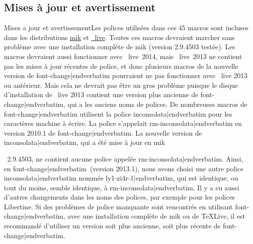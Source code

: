 {\subsection{Mises \`a jour et avertissement}{Mises a jour et avertissement}Les polices utilis\'ees dans ces 45 macros sont incluses dans  les distributions \href{http://miktex.org/}{{\caps m{\eightrm i}k}\capstex} et \href{http://www.tug.org/texlive/}{\capstex~{\caps l{\eightrm ive}}}. Toutes ces macros devraient marcher sans probl\`eme avec une installation compl\`ete de {{\caps m{\eightrm i}k}\capstex} (version 2.9.4503 test\'ee). Les macros devraient aussi fonctionner avec \capstex~{\caps l{\eightrm ive}}~2014, mais \capstex~{\caps l{\eightrm ive}}~2013 ne contient pas les mises \`a jour r\'ecentes de police, et donc plusieurs macros de la nouvelle version de {\color{brown}\verbatim font-change|endverbatim} pourraient ne pas fonctionner avec \capstex~{\caps l{\eightrm ive}} 2013 ou ant\'erieur. Mais cela ne devrait pas \^etre un gros probl\`eme puisque le disque d'installation de \capstex~{\caps l{\eightrm ive}} 2013 contient une version plus ancienne de {\color{brown}\verbatim font-change|endverbatim}, qui a les anciens noms de polices. De nombreuses macros de {\color{brown}\verbatim font-change|endverbatim} utilisent la police {\verbatim inconsolata|endverbatim} pour les caract\`eres machine \`a \'ecrire. La police s'appelait {\verbatim rm-inconsolata|endverbatim} en version 2010.1 de {\color{brown}\verbatim font-change|endverbatim}. La nouvelle version de {\verbatim inconsolata|endverbatim}, qui a \'et\'e mise \`a jour en {\caps m{\eightrm i}k}\capstex}~2.9.4503, ne contient aucune police appel\'ee {\verbatim rm-inconsolata|endverbatim}. Ainsi, en {\color{brown}\verbatim font-change|endverbatim}~(version 2013.1), nous avons choisi une autre police {\verbatim inconsolata|endverbatim} nomm\'ee {\verbatim ly1-zi4r-1|endverbatim}, qui est identique, ou tout du moins, semble identique, \`a {\verbatim rm-inconsolata|endverbatim}. Il y a eu aussi d'autres changements dans les noms des polices, par exemple pour les polices Libertine. Si des probl\`emes de police manquante sont rencontr\'es en utilisant {\color{brown}\verbatim font-change|endverbatim}, avec une installation compl\`ete de {{\caps m{\eightrm i}k}\capstex} ou de TeXLive, il est recommand\'e d'utiliser un version soit plus ancienne, soit plus r\'ecente de {\color{brown}\verbatim font-change|endverbatim}.

\footline{\centerline{\foliofont\folio}}


